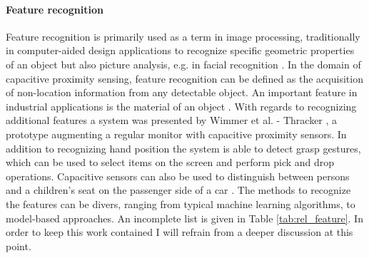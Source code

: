 \paragraph{Feature recognition}
Feature recognition is primarily used as a term in image processing, traditionally in computer-aided design applications to recognize specific geometric properties of an object but also picture analysis, e.g. in facial recognition \cite{han2000manufacturing,belhumeur1997eigenfaces}. 
In the domain of capacitive proximity sensing, feature recognition can be defined as the acquisition of non-location information from any detectable object. An important feature in industrial applications is the material of an object \cite{Baxter1996}. With regards to recognizing additional features a system was presented by Wimmer et al. - Thracker \cite{Wimmer2006}, a prototype augmenting a regular monitor with capacitive proximity sensors. In addition to recognizing hand position the system is able to detect grasp gestures, which can be used to select items on the screen and perform pick and drop operations. Capacitive sensors can also be used to distinguish between persons and a children's seat on the passenger side of a car \cite{george2009seat}. 
The methods to recognize the features can be divers, ranging from typical machine learning algorithms, to model-based approaches. An incomplete list is given in Table \ref{tab:rel_feature}. In order to keep this work contained I will refrain from a deeper discussion at this point.

